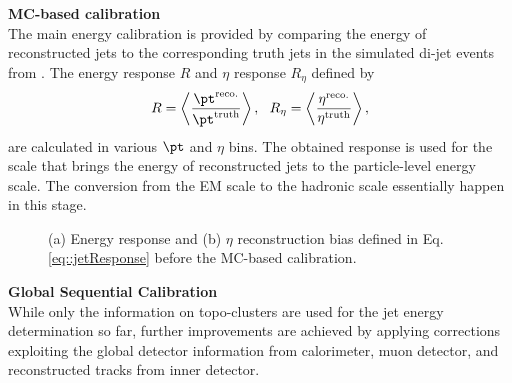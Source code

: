 \begin{description}
\item \textbf{MC-based calibration} \\
The main energy calibration is provided by comparing the energy of reconstructed jets to the corresponding truth jets in the simulated di-jet events from \pythia. The energy response $R$ and $\eta$ response $R_\eta$ defined by
\begin{align}
R = \left< \frac{\pt^{\mathrm{reco.}}}{\pt^{\mathrm{truth}}} \right>, \,\,\,\, 
R_\eta = \left< \frac{\eta^{\mathrm{reco.}}}{\eta^{\mathrm{truth}}} \right>, 
\label{eq::jetResponse}
\end{align}
are calculated in various $\pt$ and $\eta$ bins. The obtained response is used for the scale that brings the energy of reconstructed jets to the particle-level energy scale. The conversion from the EM scale to the hadronic scale essentially happen in this stage.
\begin{figure}[h]
  \centering
    \caption{ (a) Energy response and (b) $\eta$ reconstruction bias defined in Eq. \ref{eq::jetResponse} before the MC-based calibration. \cite{144_JESmeas_2015data}
      \label{fig::objDef::jetResponse} }
\end{figure}





\item \textbf{Global Sequential Calibration} \\
While only the information on topo-clusters are used for the jet energy determination so far, further improvements are achieved by applying corrections exploiting the global detector information from calorimeter, muon detector, and reconstructed tracks from inner detector. 


\end{description}
